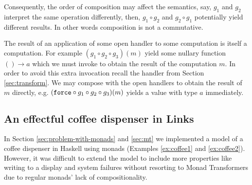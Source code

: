 Consequently, the order of composition may affect the semantics, say, $g_1$ and $g_2$ interpret the same operation differently, then, $g_1 \circ g_2$ and $g_2 \circ g_1$ potentially yield different results. In other words composition is not a commutative.

The result of an application of some open handler to some computation is itself a computation. For example $(g_1 \circ g_2 \circ g_3)(m)$ yield some nullary function $() \to a$ which we must invoke to obtain the result of the computation $m$. In order to avoid this extra invocation recall the  handler from Section \ref{sec:transform}. We may compose  with the open handlers to obtain the result of $m$ directly, e.g. $(\texttt{force} \circ g_1 \circ g_2 \circ g_3)(m)$ yields a value with type $a$ immediately.

\subsection{An effectful coffee dispenser in Links}
In Section \ref{sec:problem-with-monads} and \ref{sec:mt} we implemented a model of a coffee dispenser in Haskell using monads (Examples \ref{ex:coffee1} and \ref{ex:coffee2}). However, it was difficult to extend the model to include more properties like writing to a display and system failures without resorting to Monad Transformers due to regular monads' lack of compositionality.

